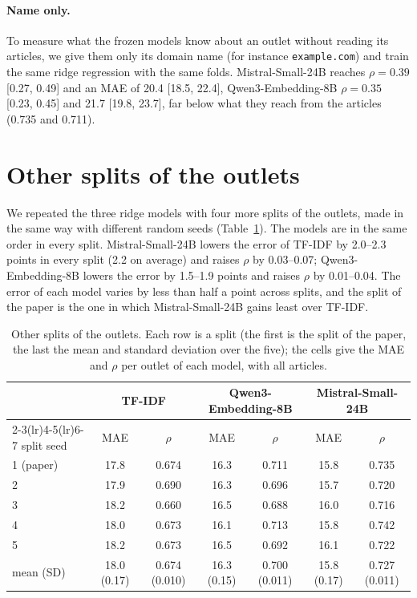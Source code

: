 \documentclass[11pt,a4paper]{article}
\begin{document}
\paragraph{Name only.} To measure what the frozen models know about an outlet without reading its articles, we give them
only its domain name (for instance \texttt{example.com}) and train the same ridge regression with the same folds.
Mistral-Small-24B reaches $\rho = 0.39$ [0.27, 0.49] and an MAE of 20.4 [18.5, 22.4], Qwen3-Embedding-8B $\rho = 0.35$
[0.23, 0.45] and 21.7 [19.8, 23.7], far below what they reach from the articles (0.735 and 0.711).


\section{Other splits of the outlets}\label{app:splits}
We repeated the three ridge models with four more splits of the outlets, made in the same way with different random
seeds (Table~\ref{tab:splits}). The models are in the same order in every split. Mistral-Small-24B lowers the error of
TF-IDF by 2.0--2.3 points in every split (2.2 on average) and raises $\rho$ by 0.03--0.07; Qwen3-Embedding-8B lowers the
error by 1.5--1.9 points and raises $\rho$ by 0.01--0.04. The error of each model varies by less than half a point
across splits, and the split of the paper is the one in which Mistral-Small-24B gains least over TF-IDF.

\begin{table}[h]
\centering
\caption{Other splits of the outlets. Each row is a split (the first is the split of the paper, the last the mean and
standard deviation over the five); the cells give the MAE and $\rho$ per outlet of each model, with all
articles.}\label{tab:splits}
\small\setlength{\tabcolsep}{4pt}
\begin{tabular}{lcccccc}
\toprule
& \multicolumn{2}{c}{TF-IDF} & \multicolumn{2}{c}{Qwen3-Embedding-8B} & \multicolumn{2}{c}{Mistral-Small-24B} \\
\cmidrule(lr){2-3}\cmidrule(lr){4-5}\cmidrule(lr){6-7}
split seed & MAE & $\rho$ & MAE & $\rho$ & MAE & $\rho$ \\
\midrule
1 (paper) & 17.8 & 0.674 & 16.3 & 0.711 & 15.8 & 0.735 \\
2 & 17.9 & 0.690 & 16.3 & 0.696 & 15.7 & 0.720 \\
3 & 18.2 & 0.660 & 16.5 & 0.688 & 16.0 & 0.716 \\
4 & 18.0 & 0.673 & 16.1 & 0.713 & 15.8 & 0.742 \\
5 & 18.2 & 0.673 & 16.5 & 0.692 & 16.1 & 0.722 \\
\midrule
mean (SD) & 18.0 (0.17) & 0.674 (0.010) & 16.3 (0.15) & 0.700 (0.011) & 15.8 (0.17) & 0.727 (0.011) \\
\bottomrule
\end{tabular}
\end{table}
\end{document}
